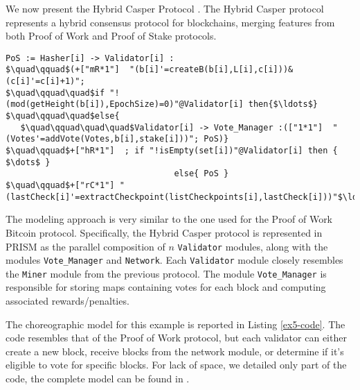 \begin{comment}
\begin{wrapfigure}[12]{l}{4.5cm}
	\texttt{[image: ethereum.pdf]}	
\end{wrapfigure} 
\end{comment}
We now present the Hybrid Casper Protocol \cite{DBLP:journals/distribledger/GallettaLMV23}. The Hybrid Casper protocol represents a hybrid consensus protocol for blockchains, merging features from both Proof of Work and Proof of Stake protocols. 
\begin{lstlisting}[style=chor-color,tabsize=2,breaklines=true, postbreak=\mbox{\textcolor{red}{$\hookrightarrow$}\space},	caption={Excerpt of the Hybrid Casper Protocol as a choreography},captionpos=b,label={ex5-code}]
PoS := Hasher[i] -> Validator[i] :
$\quad\qquad$(+["mR*1"]  "(b[i]'=createB(b[i],L[i],c[i]))&(c[i]'=c[i]+1)"; 
$\quad\qquad\quad$if "!(mod(getHeight(b[i]),EpochSize)=0)"@Validator[i] then{$\ldots$}
$\quad\qquad\quad$else{
   $\quad\qquad\quad\quad$Validator[i] -> Vote_Manager :(["1*1"]  "(Votes'=addVote(Votes,b[i],stake[i]))"; PoS)}
$\quad\qquad$+["hR*1"]  ; if "!isEmpty(set[i])"@Validator[i] then { $\dots$ }
 							      else{ PoS }
$\quad\qquad$+["rC*1"] "(lastCheck[i]'=extractCheckpoint(listCheckpoints[i],lastCheck[i]))"$\ldots$
\end{lstlisting}
The modeling approach is very similar to the one used for the Proof of Work Bitcoin protocol. Specifically, the Hybrid Casper protocol is represented in PRISM as the parallel composition of $n$ \texttt{Validator} modules, along with the modules \texttt{Vote\_Manager} and \texttt{Network}. Each \texttt{Validator} module closely resembles the \texttt{Miner} module from the previous protocol. The module \texttt{Vote\_Manager} is responsible for storing maps containing votes for each block and computing associated rewards/penalties.

The choreographic model for this example is reported in Listing \ref{ex5-code}. 
The code resembles that of the Proof of Work protocol, but each validator can either create a new block, receive blocks from the network module, or determine if it's eligible to vote for specific blocks.
For lack of space, we detailed only part of the code, the complete model can be found in \cite{repository}.



